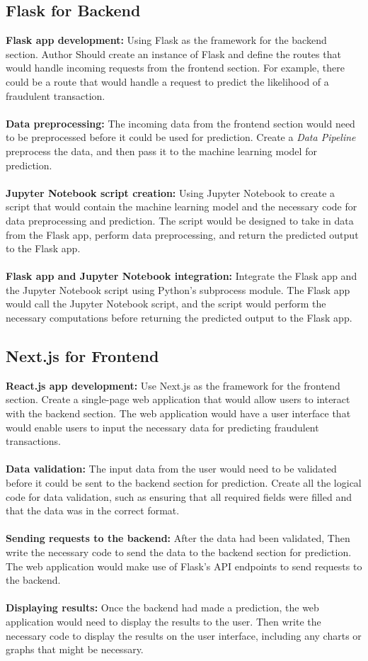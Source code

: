 \subsection{Flask for Backend}
\textbf{Flask app development:} Using Flask as the framework for the backend section. Author Should create an 
instance of Flask and define the routes that would handle incoming requests from the frontend section. For example, 
there could be a route that would handle a request to predict the likelihood of a fraudulent transaction.\\\\
\textbf{Data preprocessing:} The incoming data from the frontend section would need to be preprocessed before it could be 
used for prediction. Create a \textit{Data Pipeline} preprocess the data, and then pass it to the machine 
learning model for prediction.\\\\
\textbf{Jupyter Notebook script creation:} Using Jupyter Notebook to create a script that would contain the 
machine learning model and the necessary code for data preprocessing and prediction. The script would be designed 
to take in data from the Flask app, perform data preprocessing, and return the predicted output to the Flask app.\\\\
\textbf{Flask app and Jupyter Notebook integration:} Integrate the Flask app and the Jupyter Notebook script 
using Python's subprocess module. The Flask app would call the Jupyter Notebook script, and the script would 
perform the necessary computations before returning the predicted output to the Flask app.

\subsection{Next.js for Frontend}
\textbf{React.js app development:} Use Next.js as the framework for the frontend section. Create a single-page web 
application that would allow users to interact with the backend section. The web 
application would have a user interface that would enable users to input the necessary data for predicting 
fraudulent transactions.\\\\
\textbf{Data validation:} The input data from the user would need to be validated before it could be sent to the 
backend section for prediction. Create all the logical code for data validation, such as ensuring that 
all required fields were filled and that the data was in the correct format.\\\\
\textbf{Sending requests to the backend:} After the data had been validated, Then write the necessary 
code to send the data to the backend section for prediction. The web application would make use of Flask's API 
endpoints to send requests to the backend.\\\\
\textbf{Displaying results:} Once the backend had made a prediction, the web application would need to display 
the results to the user. Then write the necessary code to display the results on the user interface, 
including any charts or graphs that might be necessary.

